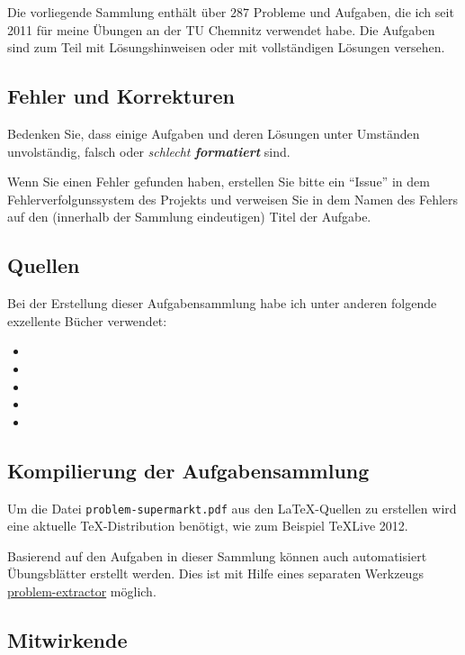 
Die vorliegende Sammlung enthält über $287$ Probleme und Aufgaben, die ich seit
2011 für meine Übungen an der TU Chemnitz verwendet habe. Die Aufgaben sind zum
Teil mit Lösungshinweisen oder mit vollständigen Lösungen versehen. 

\subsection*{Fehler und Korrekturen}

Bedenken Sie, dass einige Aufgaben und deren Lösungen unter Umständen
unvolständig, falsch oder \emph{schlecht \textbf{formatiert}} sind. 

Wenn Sie einen Fehler gefunden haben, erstellen Sie bitte ein ``Issue'' in dem
Fehlerverfolgunssystem des Projekts und verweisen Sie in dem Namen des Fehlers
auf den (innerhalb der Sammlung eindeutigen) Titel der Aufgabe. 

\subsection*{Quellen}

Bei der Erstellung dieser Aufgabensammlung habe ich unter anderen folgende
exzellente Bücher verwendet:

\begin{itemize}
    \item {}
    \item {}
    \item {}
    \item {}
    \item {}
\end{itemize}

\subsection*{Kompilierung der Aufgabensammlung} 

Um die Datei \texttt{problem-supermarkt.pdf} aus den \LaTeX{}-Quellen zu erstellen
wird eine aktuelle \TeX{}-Distribution benötigt, wie zum Beispiel \TeX{}Live 2012. 

Basierend auf den Aufgaben in dieser Sammlung können auch automatisiert 
Übungsblätter erstellt werden. Dies ist mit Hilfe eines separaten Werkzeugs 
\href{https://github.com/jwergieluk/problem-extractor}{problem-extractor}
möglich. 

\subsection*{Mitwirkende}


